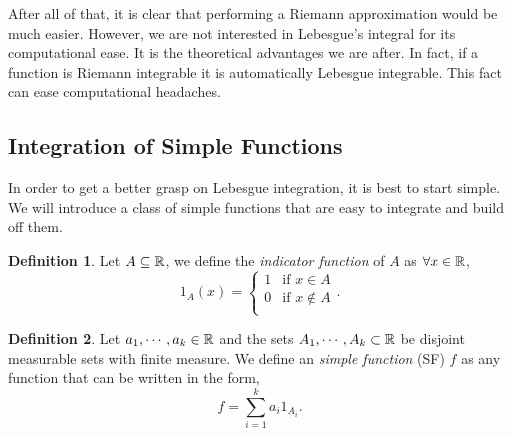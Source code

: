 \documentclass{article}
\theoremstyle{axiom} \newtheorem{axiom}{Axiom}
\theoremstyle{definition} \newtheorem{definition}{Definition}
\theoremstyle{example} \newtheorem{example}{Example}
\theoremstyle{proposition} \newtheorem{prop}{Proposition}
\theoremstyle{lemma} \newtheorem{lemma}{Lemma}
\begin{document}
After all of that, it is clear that performing a Riemann approximation would be
much easier. However, we are not interested in Lebesgue's integral for its 
computational ease. It is the theoretical advantages we are after. In fact, if
a function is Riemann integrable it is automatically Lebesgue integrable. This
fact can ease computational headaches.

\subsection{Integration of Simple Functions}

In order to get a better grasp on Lebesgue integration, it is best to start 
simple. We will introduce a class of simple functions that are easy to integrate
and build off them. 

\begin{definition}
	Let $A \subseteq \mathbb{R}$, we define the \textit{indicator function} of $A$
	as $\forall x \in \mathbb{R}$,
	\begin{equation}
		1_{A}(x) = \begin{cases}
			1 & \text{if  $x\in A$} \\	
			0 & \text{if $x\not \in A$} \\	
		\end{cases}.
	\end{equation}
\end{definition}

\begin{definition}
	Let $a_1,\cdots,a_k \in \mathbb{R}$ and the sets $A_1,\cdots,A_k \subset \mathbb{R}$ be 
	disjoint measurable sets with finite measure. We define an
	\textit{simple function} (SF) $f$ as any function that can be written in the
	form,
	\begin{equation}
		f = \sum_{i=1}^k a_i1_{A_i}.
	\end{equation}
\end{definition}
\end{document}
